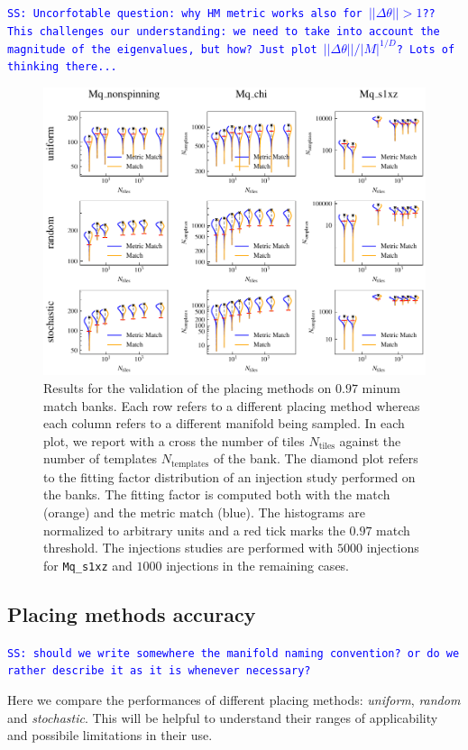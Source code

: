 \documentclass[twocolumn,showpacs,preprintnumbers,nofootinbib,prd,
superscriptaddress,10pt]{revtex4-2}
\newcommand{\stefano}[1]{{\textcolor{blue}{\texttt{SS: #1}} }}
\begin{document}
\stefano{Uncorfotable question: why HM metric works also for $||\Delta\theta||>1$?? This challenges our understanding: we need to take into account the magnitude of the eigenvalues, but how? Just plot $||\Delta\theta||/|M|^{1/D}$? Lots of thinking there...}

\begin{figure}[t!]
	\centering
	\includegraphics[width=.75\textwidth,keepaspectratio]{placing_validation}
	\caption{Results for the validation of the placing methods on $0.97$ minum match banks. Each row refers to a different placing method whereas each column refers to a different manifold being sampled. In each plot, we report with a cross the number of tiles $N_{\text{tiles}}$ against the number of templates $N_{\text{templates}}$ of the bank.
	The diamond plot refers to the fitting factor distribution of an injection study performed on the banks. The fitting factor is computed both with the match (orange) and the metric match (blue). The histograms are normalized to arbitrary units and a red tick marks the $0.97$ match threshold.
	The injections studies are performed with $5000$ injections for \texttt{Mq\_s1xz} and $1000$ injections in the remaining cases.
	}
	\label{fig:placing_validation}
\end{figure}

\subsection{Placing methods accuracy} \label{sec:placing_accuracy}

\stefano{should we write somewhere the manifold naming convention? or do we rather describe it as it is whenever necessary?}

Here we compare the performances of different placing methods: \textit{uniform}, \textit{random} and \textit{stochastic}.
This will be helpful to understand their ranges of applicability and possibile limitations in their use.
\end{document}
